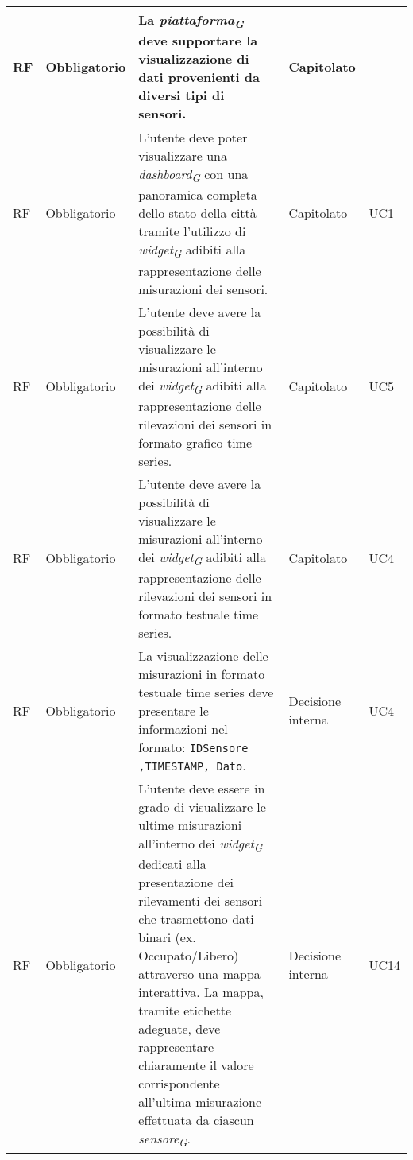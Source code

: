 \begin{longtable}{|C{1.5cm}|C{2cm}|L{5cm}|C{2cm}|C{1.5cm}|}
    \hline
     RF & Obbligatorio & La \textit{piattaforma}\textsubscript{\textit{G}} deve supportare la visualizzazione di dati provenienti da diversi tipi di sensori.& Capitolato & \\
    
    \hline
     RF & Obbligatorio & L'utente deve poter visualizzare una \textit{dashboard}\textsubscript{\textit{G}} con una panoramica completa dello stato della città tramite l'utilizzo di \textit{widget}\textsubscript{\textit{G}} adibiti alla rappresentazione delle misurazioni dei sensori.& Capitolato & UC1 \\
    
    \hline
     RF & Obbligatorio & L'utente deve avere la possibilità di visualizzare le misurazioni all'interno dei \textit{widget}\textsubscript{\textit{G}} adibiti alla rappresentazione delle rilevazioni dei sensori in formato grafico time series.& Capitolato & UC5\\
    
    \hline
     RF & Obbligatorio & L'utente deve avere la possibilità di visualizzare le misurazioni all'interno dei \textit{widget}\textsubscript{\textit{G}} adibiti alla rappresentazione delle rilevazioni dei sensori in formato testuale time series.& Capitolato & UC4\\
    
    \hline
     RF & Obbligatorio & La visualizzazione delle misurazioni in formato testuale time series deve presentare le informazioni nel formato: \texttt{IDSensore ,TIMESTAMP, Dato}.& Decisione interna & UC4 \\
   
    \hline
     RF & Obbligatorio &  L'utente deve essere in grado di visualizzare le ultime misurazioni all'interno dei \textit{widget}\textsubscript{\textit{G}} dedicati alla presentazione dei rilevamenti dei sensori che trasmettono dati binari (ex. Occupato/Libero) attraverso una mappa interattiva. La mappa, tramite etichette adeguate, deve rappresentare chiaramente il valore corrispondente all'ultima misurazione effettuata da ciascun \textit{sensore}\textsubscript{\textit{G}}.& Decisione interna & UC14 \\
    

\end{longtable}
